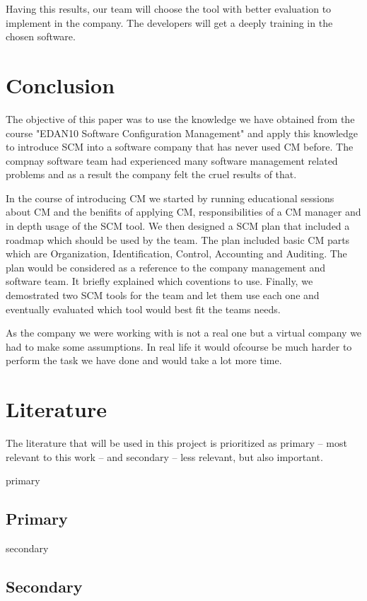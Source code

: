 \documentclass[a4paper]{article}
\begin{document}
Having this results, our team will choose the tool with better evaluation to implement in the company. 
The developers will get a deeply training in the chosen software.

\section{Conclusion}

The objective of this paper was to use the knowledge we have obtained from the course "EDAN10 Software Configuration Management" and apply this knowledge to introduce SCM into a software company that has never used CM before. The compnay software team had experienced many software management related problems and as a result the company felt the cruel results of that. 

In the course of introducing CM we started by running educational sessions about CM and the benifits of applying CM, responsibilities of a CM manager and in depth usage of the SCM tool. We then designed a SCM plan that included a roadmap which should be used by the team. The plan included basic CM parts which are Organization, Identification, Control, Accounting and Auditing. The plan would be considered as a reference to the company management and software team. It briefly explained which coventions to use. Finally, we demostrated two SCM tools for the team and let them use each one and eventually evaluated which tool would best fit the teams needs.

As the company we were working with is not a real one but a virtual company we had to make some assumptions. In real life it would ofcourse be much harder to perform the task we have done and would take a lot more time.      

\newpage
\appendix
\section{Literature}

The literature that will be used in this project is prioritized as primary -- most relevant to this work -- and secondary -- less relevant, but also important. 
\begin{btSect}[alpha]{primary}
\subsection{Primary}
\btPrintAll
\end{btSect}

\begin{btSect}[alpha]{secondary}
\subsection{Secondary}
\btPrintAll
\end{btSect}
\end{document}
